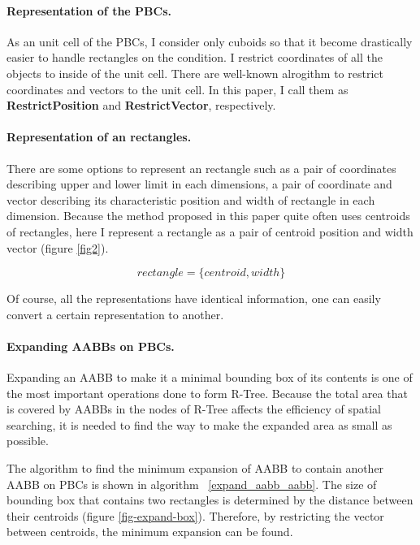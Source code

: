 \documentclass[10pt,letterpaper,twocolumn]{article}
\begin{document}
\paragraph{Representation of the PBCs.}
As an unit cell of the PBCs, I consider only cuboids so that it become
drastically easier to handle rectangles on the condition.
I restrict coordinates of all the objects to inside of the unit cell.
There are well-known alrogithm to restrict coordinates and vectors to the unit
cell. In this paper, I call them as \textbf{RestrictPosition} and
\textbf{RestrictVector}, respectively.

\paragraph{Representation of an rectangles.}
There are some options to represent an rectangle such as a pair of coordinates
describing upper and lower limit in each dimensions, a pair of coordinate and
vector describing its characteristic position and width of rectangle in each
dimension. Because the method proposed in this paper quite often uses centroids
of rectangles, here I represent a rectangle as a pair of centroid position and
width vector (figure \ref{fig2}).

\begin{equation}
    rectangle = \{centroid, width\}
\end{equation}

Of course, all the representations have identical information, one can easily
convert a certain representation to another.

\paragraph{Expanding AABBs on PBCs.}
Expanding an AABB to make it a minimal bounding box of its contents is one of
the most important operations done to form R-Tree.
Because the total area that is covered by AABBs in the nodes of R-Tree affects
the efficiency of spatial searching, it is needed to find the way to make the
expanded area as small as possible.

The algorithm to find the minimum expansion of AABB to contain another AABB on
PBCs is shown in algorithm ~\ref{expand_aabb_aabb}.
The size of bounding box that contains two rectangles is determined by the
distance between their centroids (figure \ref{fig-expand-box}).
Therefore, by restricting the vector between centroids, the minimum expansion
can be found.
\end{document}
